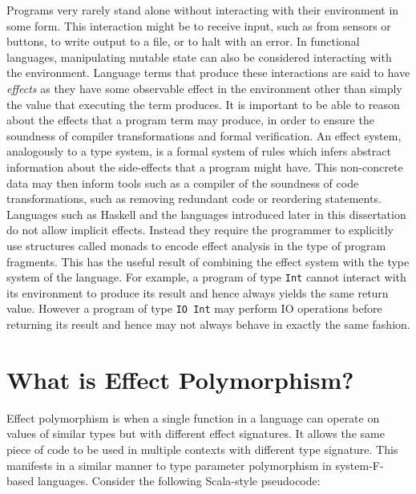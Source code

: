 \documentclass{Report}
\begin{document}
Programs very rarely stand alone without interacting with their environment in some form. This interaction might be to receive input, such as from sensors or buttons, to write output to a file, or to halt with an error. In functional languages, manipulating mutable state can also be considered interacting with the environment. Language terms that produce these interactions are said to have \textit{effects} as they have some observable effect in the environment other than simply the value that executing the term produces. It is important to be able to reason about the effects that a program term may produce, in order to ensure the soundness of compiler transformations and formal verification. An effect system, analogously to a type system, is a formal system of rules which infers abstract information about the side-effects that a program might have. This non-concrete data may then inform tools such as a compiler of the soundness of code transformations, such as removing redundant code or reordering statements. Languages such as Haskell and the languages introduced later in this dissertation do not allow implicit effects. Instead they require the programmer to explicitly use structures called monads \cite{MoggiMonads} to encode effect analysis in the type of program fragments. This has the useful result of combining the effect system with the type system of the language. For example, a program of type \texttt{Int} cannot interact with its environment to produce its result and hence always yields the same return value. However a program of type \texttt{IO Int} may perform IO operations before returning its result and hence may not always behave in exactly the same fashion.

\section{What is Effect Polymorphism?}


Effect polymorphism is when a single function in a language can operate on values of similar types but with different effect signatures. It allows the same piece of code to be used in multiple contexts with different type signature. This manifests in a similar manner to type parameter polymorphism in system-F-based languages. Consider the following Scala-style pseudocode:
\end{document}
